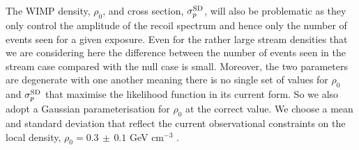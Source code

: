 The WIMP density, $\rho_0$, and cross section, $\sigma^{\rm SD}_p$, will also be problematic as they only control the amplitude of the recoil spectrum and hence only the number of events seen for a given exposure. Even for the rather large stream densities that we are considering here the difference between the number of events seen in the stream case compared with the null case is small. Moreover, the two parameters are degenerate with one another meaning there is no single set of values for $\rho_0$ and $\sigma^{\rm SD}_p$ that maximise the likelihood function in its current form. So we also adopt a Gaussian parameterisation for $\rho_0$ at the correct value. We choose a mean and standard deviation that reflect the current observational constraints on the local density, $\rho_0 = 0.3 \, \pm \, 0.1$ GeV cm$^{-3}$ \cite{Read:2014qva}.

